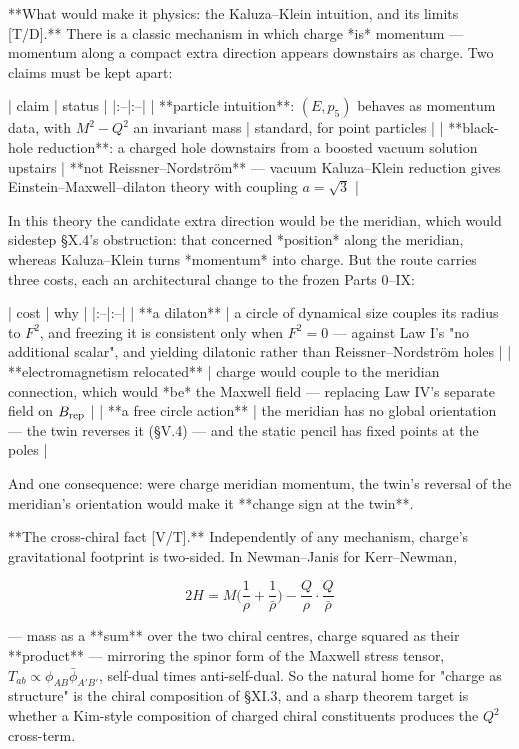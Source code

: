 **What would make it physics: the Kaluza–Klein intuition, and its limits [T/D].** There is a classic mechanism in which charge *is* momentum — momentum along a compact extra direction appears downstairs as charge. Two claims must be kept apart:

| claim | status |
|:--|:--|
| **particle intuition**: $(E,p_5)$ behaves as momentum data, with $M^2-Q^2$ an invariant mass | standard, for point particles |
| **black-hole reduction**: a charged hole downstairs from a boosted vacuum solution upstairs | **not Reissner–Nordström** — vacuum Kaluza–Klein reduction gives Einstein–Maxwell–dilaton theory with coupling $a = \sqrt3$ |

In this theory the candidate extra direction would be the meridian, which would sidestep §X.4's obstruction: that concerned *position* along the meridian, whereas Kaluza–Klein turns *momentum* into charge. But the route carries three costs, each an architectural change to the frozen Parts 0–IX:

| cost | why |
|:--|:--|
| **a dilaton** | a circle of dynamical size couples its radius to $F^2$, and freezing it is consistent only when $F^2 = 0$ — against Law I's "no additional scalar", and yielding dilatonic rather than Reissner–Nordström holes |
| **electromagnetism relocated** | charge would couple to the meridian connection, which would *be* the Maxwell field — replacing Law IV's separate field on $B_{\rm rep}$ |
| **a free circle action** | the meridian has no global orientation — the twin reverses it (§V.4) — and the static pencil has fixed points at the poles |

And one consequence: were charge meridian momentum, the twin's reversal of the meridian's orientation would make it **change sign at the twin**.

**The cross-chiral fact [V/T].** Independently of any mechanism, charge's gravitational footprint is two-sided. In Newman–Janis for Kerr–Newman,

$$2H = M\Big(\frac1\rho+\frac1{\bar\rho}\Big)-\frac{Q}{\rho}\cdot\frac{Q}{\bar\rho}$$

— mass as a **sum** over the two chiral centres, charge squared as their **product** — mirroring the spinor form of the Maxwell stress tensor, $T_{ab}\propto\phi_{AB}\bar\phi_{A'B'}$, self-dual times anti-self-dual. So the natural home for "charge as structure" is the chiral composition of §XI.3, and a sharp theorem target is whether a Kim-style composition of charged chiral constituents produces the $Q^2$ cross-term.

